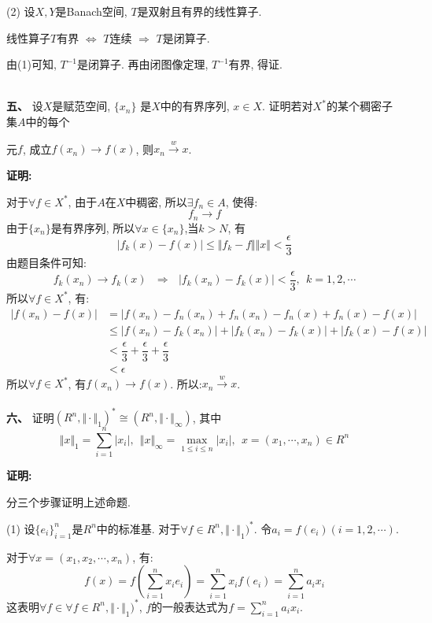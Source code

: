 \documentclass{article}
\begin{document}
(2) 设$X, Y$是Banach空间, $T$是双射且有界的线性算子.

\hspace{1.5em} 线性算子$T$有界 $\Leftrightarrow$ $T$连续 $\Rightarrow$ $T$是闭算子.

\hspace{1.5em} 由(1)可知, $T^{-1}$是闭算子. 再由闭图像定理, $T^{-1}$有界, 得证.  \\  \ 


\textbf{五、} 设$X$是赋范空间, $\{ x_n \}$ 是$X$中的有界序列, $x \in X$. 证明若对$X^*$的某个稠密子集$A$中的每个

\hspace{2em} 元$f$, 成立$f(x_n) \rightarrow f(x)$, 则$x_n \xrightarrow{w} x$. 

\textbf{证明:}

对于$\forall f \in X^*$, 由于$A$在$X$中稠密, 所以$\exists f_n \in A$, 使得:
$$ f_n \rightarrow f $$
由于$\{ x_n \}$是有界序列, 所以$\forall x \in \{ x_n \}$,当$k>N$, 有
$$|f_k(x) - f(x)| \leq \Vert f_k - f \Vert \Vert x \Vert < \dfrac{\epsilon}{3}$$
 由题目条件可知:
$$ f_k(x_n) \rightarrow f_k(x) \ \ \ \Rightarrow \ \ \ |f_k(x_n) - f_k(x)| < \dfrac{\epsilon}{3}, \ \ k=1,2, \cdots $$
所以$\forall f \in X^*$, 有:
\begin{align*}
|f(x_n) - f(x)| &= |f(x_n) - f_n(x_n) + f_n(x_n) -f_n(x) + f_n(x) - f(x) | \\
                &\leq |f(x_n) - f_k(x_n)| + |f_k(x_n) - f_k(x)| + |f_k(x) - f(x)|  \\
                &< \dfrac{\epsilon}{3} + \dfrac{\epsilon}{3} + \dfrac{\epsilon}{3} \\
                &< \epsilon
\end{align*}
所以$\forall f \in X^*$, 有$f(x_n) \rightarrow f(x)$. 所以:$x_n \xrightarrow{w} x$. \\  \\


\textbf{六、} 证明$(R^n, \Vert \cdot \Vert_1)^* \cong (R^n, \Vert \cdot \Vert_{\infty}) $, 其中
$$ \Vert x \Vert_1 = \sum\limits_{i=1}^n |x_i|, \ \ \Vert x \Vert_{\infty} = \max\limits_{1 \leq i \leq n} |x_i|, \ \ x=(x_1, \cdots, x_n) \in R^n $$ 

\textbf{证明:} 

分三个步骤证明上述命题.

(1) 设$\{e_i \}_{i=1}^n$是$R^n$中的标准基. 对于$\forall f \in R^n, \Vert \cdot \Vert_1)^*$. 令$a_i = f(e_i)(i=1, 2, \cdots)$. 

对于$\forall x=(x_1, x_2, \cdots, x_n)$, 有:
$$ f(x) = f(\sum\limits_{i=1}^n x_ie_i) = \sum\limits_{i=1}^n x_if(e_i) = \sum\limits_{i=1}^n a_ix_i $$
这表明$\forall f \in \forall f \in R^n, \Vert \cdot \Vert_1)^* $, $f$的一般表达式为$f =\sum\limits_{i=1}^n a_ix_i$.
\end{document}
